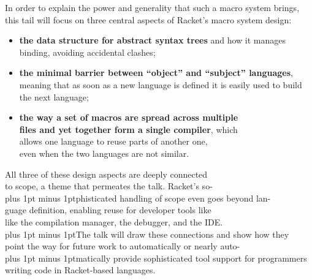 \documentclass[runningheads]{llncs}
\newcommand{\MoreSpace}{\spaceskip 4pt plus 1pt minus 1pt}
\begin{document}
In order to explain the power and generality that such a macro system
brings, this tail will focus on three central aspects of Racket's
macro system design:
\begin{itemize}

\item \textbf{the data structure for abstract syntax trees} and how it
  manages binding, avoiding accidental clashes;

\item \textbf{the minimal barrier between ``object'' and ``subject''
  languages}, meaning that as soon as a new language is defined it
  is easily used to build\\ the next language;

\item 
\textbf{the way a set of macros are spread across multiple\\ files and
  yet together form a single compiler}, which\\ allows one language to
reuse parts of another one,\\ even when the two languages are not similar.
\end{itemize}

All three of these design aspects are deeply connected \\ to scope, a
theme that permeates the talk. Racket's so-\\
{\MoreSpace{}phisticated handling of scope even goes beyond lan-}\\
{guage definition, enabling reuse for developer tools like}\\ 
like the compilation manager, the debugger, and the IDE.\\
{\MoreSpace{}The talk will draw these connections and show how they}\\
point the way for future work to automatically or nearly auto-\\
{\MoreSpace{}matically provide sophisticated tool support for programmers}\\ 
writing code in Racket-based languages.
\end{document}
